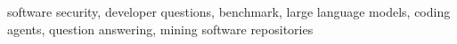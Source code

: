 \documentclass[10pt,conference]{IEEEtran}
\begin{document}
\begin{IEEEkeywords}
software security, developer questions, benchmark, large language models, coding agents, question answering, mining software repositories
\end{IEEEkeywords}









\end{document}
